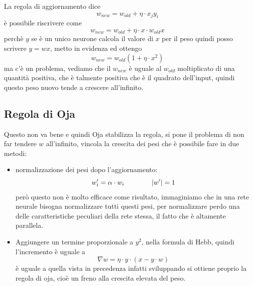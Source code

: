 \noindent La regola di aggiornamento dice
\begin{equation}
w_{new} = w_{old} +  \eta \cdot x_j y_i
\end{equation}
è possibile riscrivere come 
\begin{equation}
w_{new} = w_{old} +  \eta \cdot x \cdot w_{old} x
\end{equation}
perchè $y$ se è un unico neurone calcola il valore di $x$ per il peso quindi posso scrivere $y=w x$, metto in evidenza ed ottengo
\begin{equation}
w_{new} = w_{old}(1 + \eta \cdot x^2) 
\end{equation}
ma c'è un problema, vediamo che il $w_{new}$ è uguale al $w_{old}$ moltiplicato di una quantità positiva, che è talmente positiva che è il quadrato dell'input, quindi questo peso nuovo tende a crescere all'infinito.

\subsection{Regola di Oja}
Questo non va bene e quindi Oja stabilizza la regola, si pone il problema di non far tendere $w$ all'infinito,  vincola la crescita dei pesi che è possibile fare in due metodi:
\begin{itemize}
\item normalizzazione dei pesi dopo l'aggiornamento: 
\begin{equation}
w_i' = \alpha \cdot w_i \quad \quad \quad \quad \lvert w'\rvert = 1
\end{equation}
però questo non è molto efficace come risultato, immaginiamo che in una rete neurale bisogna normalizzare tutti questi pesi, per normalizzare perdo una delle caratteristiche peculiari della rete stessa, il fatto che è altamente parallela. 
\item Aggiungere un termine proporzionale a $y^2$, nella formula di Hebb, quindi l'incremento è uguale a
\begin{equation}
\nabla w =\eta \cdot y \cdot (x  - y \cdot w)
\end{equation}
è uguale a quella vista in precedenza infatti sviluppando si ottiene proprio la regola di oja, cioè un freno alla crescita elevata del peso.
\end{itemize}

